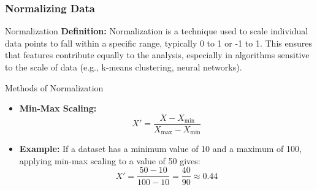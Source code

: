 \documentclass{beamer}
\begin{document}
\begin{frame}[fragile]
    \frametitle{Normalizing Data}
    \begin{block}{Normalization}
        \textbf{Definition:} Normalization is a technique used to scale individual data points to fall within a specific range, typically 0 to 1 or -1 to 1. This ensures that features contribute equally to the analysis, especially in algorithms sensitive to the scale of data (e.g., k-means clustering, neural networks).
    \end{block}

    \begin{block}{Methods of Normalization}
        \begin{itemize}
            \item \textbf{Min-Max Scaling:} 
            \begin{equation}
            X' = \frac{X - X_{\text{min}}}{X_{\text{max}} - X_{\text{min}}}
            \end{equation}
            \item \textbf{Example:} 
            If a dataset has a minimum value of 10 and a maximum of 100, applying min-max scaling to a value of 50 gives:
            \begin{equation}
            X' = \frac{50 - 10}{100 - 10} = \frac{40}{90} \approx 0.44
            \end{equation}
        \end{itemize}
    \end{block}
\end{frame}
\end{document}
